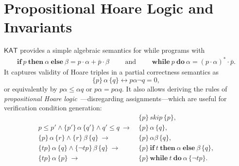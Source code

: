 \documentclass[envcountsame,envcountsect]{llncs}
\newcommand{\IF}[3]{\mathbf{if}\ #1\ \mathbf{then}\ #2\ \mathbf{else}\ #3}
\newcommand{\WHILE}[2]{\mathbf{while}\ #1\ \mathbf{do}\ #2}
\newcommand{\sskip}{\mathit{skip}}
\newcommand{\KAT}{\mathsf{KAT}}
\begin{document}

\section{Propositional Hoare Logic and Invariants}\label{sec:hl-invariants}

$\KAT$ provides a simple algebraic semantics for while
programs with
\begin{align*}
  \IF{p}{\alpha}{\beta} = p\cdot \alpha + \bar p \cdot
  \beta\qquad\text{ and }\qquad
\WHILE{p}{\alpha} = (p\cdot \alpha)^\ast \cdot \bar p.
\end{align*}
It captures validity of Hoare triples in
a partial correctness semantics as
\begin{equation*}
  \{p\}\, \alpha\, \{q\} \leftrightarrow p\alpha\neg q = 0,
\end{equation*}
or equivalently by $p\alpha\le \alpha q$ or $p\alpha = p\alpha q$. It
also allows deriving the rules of \emph{propositional Hoare
  logic}~\cite{Kozen00}---disregarding assignments---which are useful for
verification condition generation:
\begin{align}
  &\{p\}\, \sskip\, \{p\}, \label{eq:h-skip}\tag{h-skip}\\
  p\le p' \land \{p'\}\, \alpha\, \{q'\} \land q'\le q\ \rightarrow\ &
                                                                       \{p\}\,
                                                                       \alpha\,
                                                                       \{q\},\label{eq:h-cons}\tag{h-cons}\\
  \{p\}\, \alpha\, \{r\} \land \{r\}\, \beta\, \{q\}\ \rightarrow\
  &\{p\}\, \alpha\beta\, \{q\},\label{eq:h-seq}\tag{h-seq}\\
  \{tp\}\, \alpha\, \{q\}\land \{\neg tp\}\, \beta\, \{q\}\
  \rightarrow\ & \{p\}\, \IF{t}{\alpha}{\beta}\, \{q\},\label{eq:h-cond}\tag{h-cond}\\
  \{tp\}\, \alpha\, \{p\}\ \rightarrow\ & \{p\}\, \WHILE{t}{\alpha}\, \{\neg tp\}.\label{eq:h-while}\tag{h-while}
\end{align}
\end{document}
